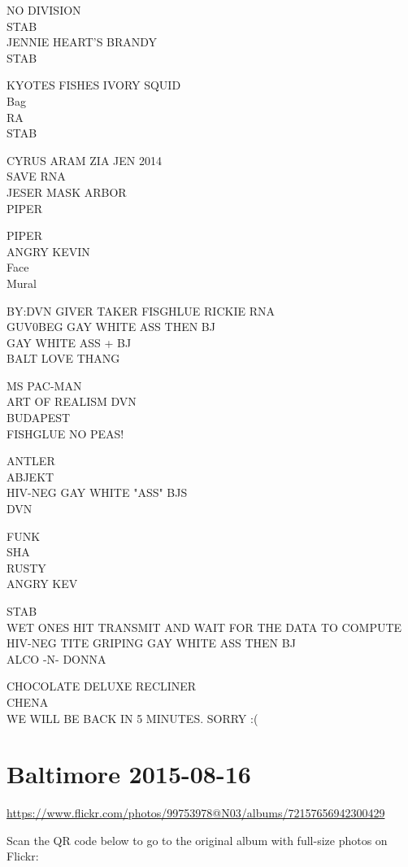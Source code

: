 \documentclass[10pt,letterpaper]{article}
\begin{document}
NO DIVISION\\
STAB\\
JENNIE HEART'S BRANDY\\
STAB

KYOTES FISHES IVORY SQUID\\
Bag\\
RA\\
STAB

CYRUS ARAM ZIA JEN 2014\\
SAVE RNA\\
JESER MASK ARBOR\\
PIPER

PIPER\\
ANGRY KEVIN\\
Face\\
Mural

BY:DVN GIVER TAKER FISGHLUE RICKIE RNA\\
GUV0BEG GAY WHITE ASS THEN BJ\\
GAY WHITE ASS + BJ\\
BALT LOVE THANG

MS PAC{-}MAN\\
ART OF REALISM DVN\\
BUDAPEST\\
FISHGLUE NO PEAS!

ANTLER\\
ABJEKT\\
HIV{-}NEG GAY WHITE "ASS" BJS\\
DVN

FUNK\\
SHA\\
RUSTY\\
ANGRY KEV

STAB\\
WET ONES HIT TRANSMIT AND WAIT FOR THE DATA TO COMPUTE\\
HIV{-}NEG TITE GRIPING GAY WHITE ASS THEN BJ\\
ALCO {-}N{-} DONNA

CHOCOLATE DELUXE RECLINER\\
CHENA\\
WE WILL BE BACK IN 5 MINUTES.  SORRY :(


\section*{Baltimore 2015-08-16}

\url{https://www.flickr.com/photos/99753978@N03/albums/72157656942300429}

Scan the QR code below to go to the original album with full-size photos on Flickr:
\end{document}

